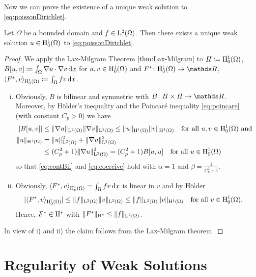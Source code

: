 Now we can prove the existence of a unique weak solution to \eqref{eq:poissonDirichlet}.

\begin{thm}
  Let $\Omega$ be a bounded domain and $f \in \mathrm{L}^2(\Omega)$.
  Then there exists a unique weak solution $u \in \mathrm{H}_0^1(\Omega)$ to \eqref{eq:poissonDirichlet}.
\end{thm}

\begin{proof}
  We apply the Lax-Milgram Theorem \ref{thm:Lax-Milgram} to $H \coloneqq \mathrm{H}_0^1(\Omega)$, $B[u,v] \coloneqq \int_\Omega \nabla u \cdot \nabla v \, {\operatorname{d}\!{x}}$ for $u,v \in \mathrm{H}_0^1(\Omega)$ and $F^* \colon \HH_0^1(\Omega) \to \R$, $\langle F^*, v \rangle_{\mathrm{H}_0^1(\Omega)} \coloneqq \int_\Omega f v \, {\operatorname{d}\!{x}}$.
  \begin{enumerate}[i)]
    \item Obviously, $B$ is bilinear and symmetric with $B \colon H \times H \to \R$.
      Moreover, by Hölder's inequality and the Poincar\'e inequality \eqref{eq:poincare} (with constant $C_p > 0$) we have
      \begin{align*}
        |B[u,v]| 
        &\leq \|\nabla u\|_{\mathrm{L}^2(\Omega)} \|\nabla v\|_{\mathrm{L}^2(\Omega)}
        \leq \|u\|_{\mathrm{H}^1(\Omega)} \|v\|_{\mathrm{H}^1(\Omega)} \quad\text{for all } u, v \in \mathrm{H}_0^1(\Omega) \text{ and } \\
        \|u\|_{\mathrm{H}^1(\Omega)} &= \|u\|_{\mathrm{L}^2(\Omega)}^2 + \|\nabla u\|_{\mathrm{L}^2(\Omega)}^2 \\
        &\leq (C_p^2 + 1) \|\nabla u\|_{\mathrm{L}^2(\Omega)}^2  
        = (C_p^2 + 1) B[u,u] \quad\text{for all } u \in \mathrm{H}_0^1(\Omega)
      \end{align*}
      so that \eqref{eq:contBil} and \eqref{eq:coercive} hold with $\alpha = 1$ and $\beta = \frac{1}{C_p^2 + 1}$.

    \item Obviously, $\langle F^*, v \rangle_{\mathrm{H}_0^1(\Omega)} = \int_\Omega f v \, {\operatorname{d}\!{x}}$ is linear in $v$ and by Hölder
      $$
      |\langle F^*, v \rangle_{\mathrm{H}_0^1(\Omega)}|
      \leq \|f\|_{\mathrm{L}^2(\Omega)} \|v\|_{\mathrm{L}^2(\Omega)}
      \leq \|f\|_{\mathrm{L}^2(\Omega)} \|v\|_{\mathrm{H}^1(\Omega)} \quad\text{for all } v \in \mathrm{H}_0^1(\Omega).
      $$
      Hence, $F^* \in \mathrm{H}^*$ with $\|F^*\|_{\mathrm{H}^*} \leq \| f \|_{\mathrm{L}^2(\Omega)}$.
    \end{enumerate}
  In view of i) and ii) the claim follows from the Lax-Milgram theorem.
\end{proof}

\section{Regularity of Weak Solutions}

